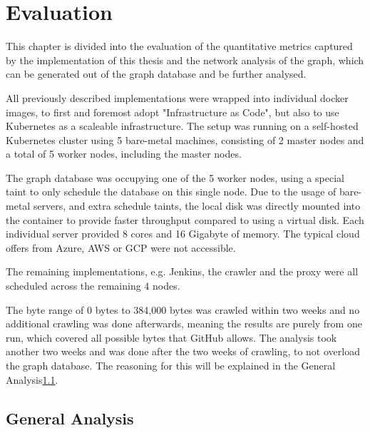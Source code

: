\chapter{Evaluation}
\label{sec:evaluation}

This chapter is divided into the evaluation of the quantitative metrics captured by the implementation of this thesis and the network analysis of the graph, which can be generated out of the graph database and be further analysed.

All previously described implementations were wrapped into individual docker images, to first and foremost adopt "Infrastructure as Code", but also to use Kubernetes as a scaleable infrastructure. The setup was running on a self-hosted Kubernetes cluster using 5 bare-metal machines, consisting of 2 master nodes and a total of 5 worker nodes, including the master nodes.

The graph database was occupying one of the 5 worker nodes, using a special taint to only schedule the database on this single node. Due to the usage of bare-metal servers, and extra schedule taints, the local disk was directly mounted into the container to provide faster throughput compared to using a virtual disk. Each individual server provided 8 cores and 16 Gigabyte of memory. The typical cloud offers from Azure, AWS or GCP were not accessible.

The remaining implementations, e.g. Jenkins, the crawler and the proxy were all scheduled across the remaining 4 nodes.

The byte range of 0 bytes to 384,000 bytes was crawled within two weeks and no additional crawling was done afterwards, meaning the results are purely from one run, which covered all possible bytes that GitHub allows. The analysis took another two weeks and was done after the two weeks of crawling, to not overload the graph database. The reasoning for this will be explained in the General Analysis\ref{sec:general_analysis}.

\section{General Analysis}
\label{sec:general_analysis}

